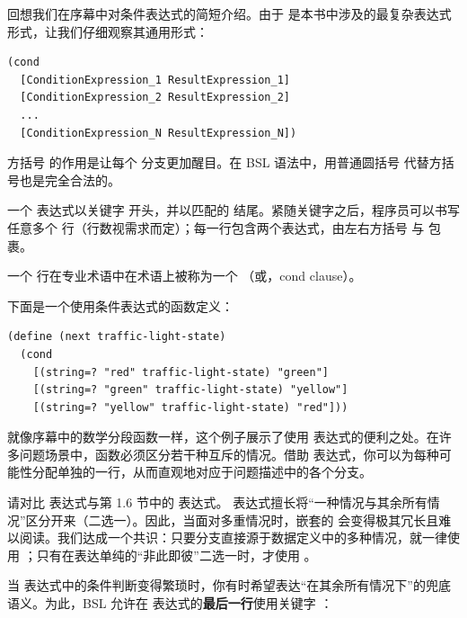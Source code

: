 回想我们在序幕中对条件表达式的简短介绍。由于  是本书中涉及的最复杂表达式形式，让我们仔细观察其通用形式：

\begin{lstlisting}[language=BSL]
(cond
  [ConditionExpression_1 ResultExpression_1]
  [ConditionExpression_2 ResultExpression_2]
  ...
  [ConditionExpression_N ResultExpression_N])
\end{lstlisting}

\begin{notebox}
方括号 \code{[...]} 的作用是让每个  分支更加醒目。在 BSL 语法中，用普通圆括号  代替方括号也是完全合法的。
\end{notebox}

一个  表达式以关键字  开头，并以匹配的 \code{)} 结尾。紧随关键字之后，程序员可以书写任意多个  行（行数视需求而定）；每一行包含两个表达式，由左右方括号 \code{[} 与 \code{]} 包裹。

一个  行在专业术语中在术语上被称为一个  （或，cond clause）。

下面是一个使用条件表达式的函数定义：

\begin{lstlisting}[language=BSL]
(define (next traffic-light-state)
  (cond
    [(string=? "red" traffic-light-state) "green"]
    [(string=? "green" traffic-light-state) "yellow"]
    [(string=? "yellow" traffic-light-state) "red"]))
\end{lstlisting}

就像序幕中的数学分段函数一样，这个例子展示了使用  表达式的便利之处。在许多问题场景中，函数必须区分若干种互斥的情况。借助  表达式，你可以为每种可能性分配单独的一行，从而直观地对应于问题描述中的各个分支。

\begin{notebox}
请对比  表达式与第 1.6 节中的  表达式。 表达式擅长将“一种情况与其余所有情况”区分开来（二选一）。因此，当面对多重情况时，嵌套的  会变得极其冗长且难以阅读。我们达成一个共识：只要分支直接源于数据定义中的多种情况，就一律使用 ；只有在表达单纯的“非此即彼”二选一时，才使用 。
\end{notebox}

当  表达式中的条件判断变得繁琐时，你有时希望表达“在其余所有情况下”的兜底语义。为此，BSL 允许在  表达式的\textbf{最后一行}使用关键字 ：

